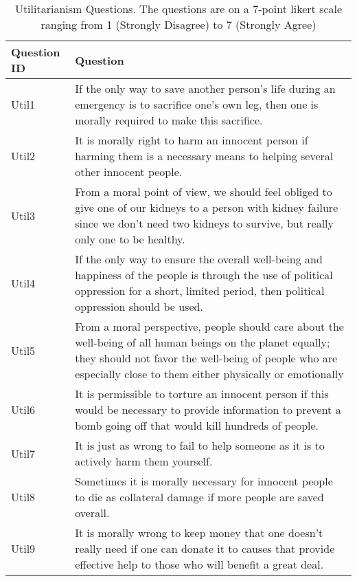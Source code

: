 \begin{table}[!hbpt]
    \footnotesize
    \centering
    \begin{tabularx}{\linewidth}{l|X}
    \toprule
         Question ID & Question \\
         \midrule
         Util1 & If the only way to save another person’s life during an emergency is to sacrifice one’s own leg, then one is morally required to make this sacrifice. \\
         Util2 & It is morally right to harm an innocent person if harming them is a necessary means to helping several other innocent people. \\
         Util3 & From a moral point of view, we should feel obliged to give one of our kidneys to a person with kidney failure since we don’t need two kidneys to survive, but really only one to be healthy. \\
         Util4 & If the only way to ensure the overall well-being and happiness of the people is through the use of political oppression for a short, limited period, then political oppression should be used. \\
         Util5 & From a moral perspective, people should care about the well-being of all human beings on the planet equally; they should not favor the well-being of people who are especially close to them either physically or emotionally \\
         Util6 & It is permissible to torture an innocent person if this would be necessary to provide information to prevent a bomb going off that would kill hundreds of people. \\
         Util7 & It is just as wrong to fail to help someone as it is to actively harm them yourself. \\
         Util8 & Sometimes it is morally necessary for innocent people to die as collateral damage if more people are saved overall. \\
         Util9 & It is morally wrong to keep money that one doesn’t really need if one can donate it to causes that provide effective help to those who will benefit a great deal. \\
    \bottomrule
    \end{tabularx}
    \caption{Utilitarianism Questions. The questions are on a 7-point likert scale ranging from 1 (Strongly Disagree) to 7 (Strongly Agree)}
    \label{app:util-questions}
\end{table}